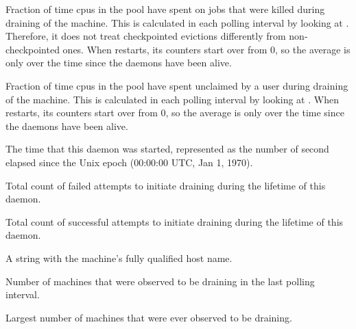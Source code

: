 \begin{description}

\item[\AdAttr{AvgDrainingBadput}:] Fraction of time cpus
in the pool have spent on jobs that were killed during draining of the
machine.  This is calculated in each polling interval by looking
at .  Therefore, it does not treat
checkpointed evictions differently from non-checkpointed ones.  When
 restarts, its counters start over from 0, so the
average is only over the time since the daemons have been alive.

\item[\AdAttr{AvgDrainingUnclaimedTime}:] Fraction of time cpus
in the pool have spent unclaimed by a user during
draining of the machine.  This is calculated in each polling interval
by looking at .  When
 restarts, its counters start over from 0, so the
average is only over the time since the daemons have been alive.

\item[\AdAttr{DaemonStartTime}:] The time that this daemon was
  started, represented as the number of second elapsed since
    the Unix epoch (00:00:00 UTC, Jan 1, 1970).

\item[\AdAttr{DrainFailures}:] Total count of failed attempts
to initiate draining during the lifetime of this  daemon.

\item[\AdAttr{DrainSuccesses}:] Total count of successful attempts
to initiate draining during the lifetime of this  daemon.

\item[\AdAttr{Machine}:] A string with the machine's fully qualified 
  host name.

\item[\AdAttr{MachinesDraining}:] Number of machines that were observed
to be draining in the last polling interval.

\item[\AdAttr{MachinesDrainingPeak}:] Largest number of machines that were
ever observed to be draining.


\end{description}
